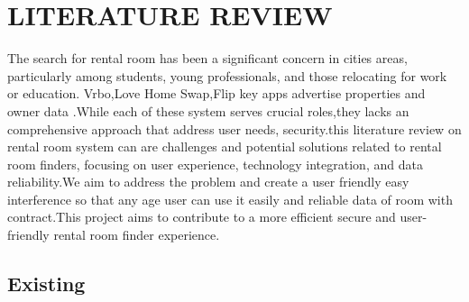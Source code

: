 
\section{LITERATURE REVIEW}
The search for rental room has been a significant concern in cities areas, particularly among students, young professionals, and those relocating for work or education. Vrbo,Love Home Swap,Flip key  apps advertise properties and owner data .While each of these system serves crucial roles,they lacks an comprehensive approach that address user needs, security.this literature review on rental room system can are challenges and potential solutions related to rental room finders, focusing on user experience, technology integration, and data reliability.We aim to address the problem and create a user friendly easy interference so that any age user can use it easily and reliable data of room with contract.This project aims to contribute to a more efficient secure and user-friendly rental room finder experience.
\subsection{Existing}

